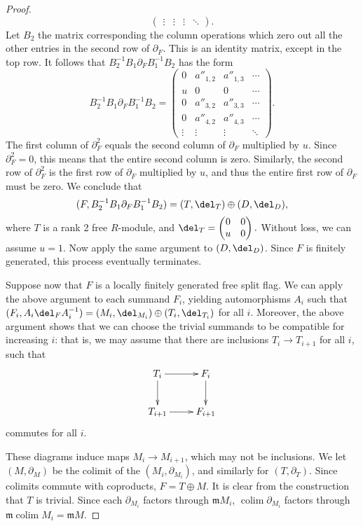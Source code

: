 \documentclass[12pt]{amsart}
\theoremstyle{definition}
\theoremstyle{remark}
\def\on{\operatorname}
\begin{document}
\begin{proof}
\[\begin{pmatrix}
\vdots&\vdots&\vdots&\ddots
\end{pmatrix}.
\]
Let $B_2$ the matrix corresponding the column operations which zero out all the other entries in the second row of $\partial_F$.  This is an identity matrix, except in the top row.  It follows that $B_2^{-1}B_1\partial_F B_1^{-1}B_2$ has the form
\[
B_2^{-1}B_1\partial_F B_1^{-1}B_2
=
\begin{pmatrix}
0&a''_{1,2}&a''_{1,3}&\cdots \\
u&0&0&\cdots \\
0&a''_{3,2}&a''_{3,3}&\cdots\\
0&a''_{4,2}&a''_{4,3}&\cdots\\
\vdots&\vdots&\vdots&\ddots
\end{pmatrix}.
\]
The first column of $\partial_F^2$ equals the second column of $\partial_F$ multiplied by $u$. Since $\partial_F^2=0$, this means that the entire second column is zero.  Similarly, the second row of $\partial_F^2$ is the first row of $\partial_F$ multiplied by $u$, and thus the entire first row of $\partial_F$ must be zero. We conclude that
$$
(F, B_2^{-1}B_1\partial_F B_1^{-1}B_2) = (T, \del_T) \oplus (D, \del_D),
$$
where $T$ is a rank 2 free $R$-module, and $\del_T = \begin{pmatrix} 0&0\\u&0 \end{pmatrix}.$ Without loss, we can assume $u = 1$. Now apply the same argument to $(D, \del_D)$. Since $F$ is finitely generated, this process eventually terminates.  

Suppose now that $F$ is a locally finitely generated free split flag. We can apply the above argument to each summand $F_i$, yielding automorphisms $A_i$ such that $(F_i, A_i \del_F A_i^{-1}) = (M_i, \del_{M_i}) \oplus (T_i, \del_{T_i})$ for all $i$. Moreover, the above argument shows that we can choose the trivial summands to be compatible for increasing $i$: that is, we may assume that there are inclusions $T_i \to T_{i+1}$ for all $i$, such that
\[
\xymatrix{
T_i \ar[r]\ar[d]&F_i\ar[d]\\
T_{i+1}\ar[r]&F_{i+1}
}
\]
commutes for all $i$. 
\iffalse
It follows that the diagram
\[
\xymatrix{
T_i \ar[d]&\ar[l]F_i\ar[d]\\
T_{i+1}&\ar[l]F_{i+1},
}
\]
where the horizontal maps are the projections, also commutes. 
\fi
These diagrams induce maps $M_{i}\to M_{i+1}$, which may not be inclusions.  We let $(M,\partial_M)$ be the colimit of the $(M_i,\partial_{M_i})$, and similarly for $(T,\partial_T)$.  Since colimits commute with coproducts, $F=T \oplus M$.  It is clear from the construction that $T$ is trivial. Since each $\partial_{M_i}$ factors through $\mathfrak mM_i$, $\on{colim} \partial_{M_i}$ factors through $\mathfrak m \on{colim} M_i=\mathfrak m M$.  
\end{proof}
\end{document}
